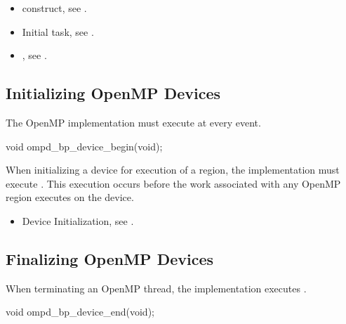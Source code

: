 \crossreferences
\begin{itemize}
\item {} construct, see .

\item Initial task, see .

\item {}, 
see .
\end{itemize}



\subsection{Initializing OpenMP Devices}
\label{subsubsec:ompd_bp_device_begin}

\summary
The OpenMP implementation must execute  
at every  event.

\format
\begin{cspecific}
\begin{ompSyntax}
void ompd_bp_device_begin(void);
\end{ompSyntax}
\end{cspecific}

\descr
When initializing a device for execution of a  region, 
the implementation must execute .
This execution occurs before the work associated with any 
OpenMP region executes on the device.

\crossreferences
\begin{itemize}
\item Device Initialization, see .
\end{itemize}



\subsection{Finalizing OpenMP Devices}
\label{subsubsec:ompd_bp_device_end}

\summary
When terminating an OpenMP thread, the implementation 
executes .

\format
\begin{cspecific}
\begin{ompSyntax}
void ompd_bp_device_end(void);
\end{ompSyntax}
\end{cspecific}

